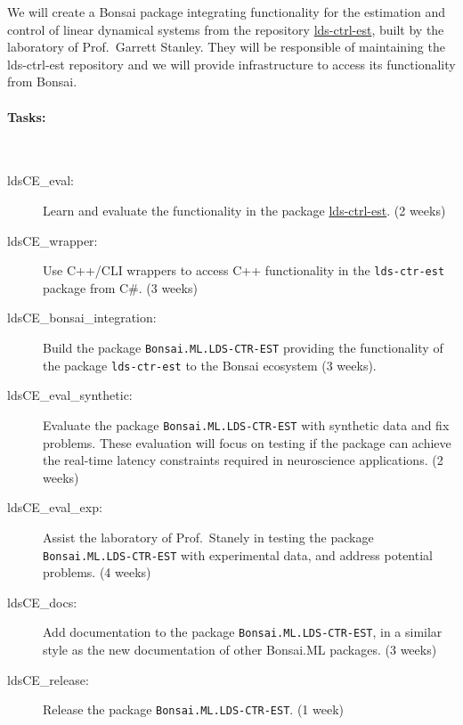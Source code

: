 We will create a Bonsai package integrating functionality for the estimation
and control of linear dynamical systems from the repository
\href{https://github.com/CLOCTools/lds-ctrl-est}{lds-ctrl-est}, built by the
laboratory of Prof.~Garrett Stanley.
%
They will be responsible of maintaining the lds-ctrl-est repository and we will
provide infrastructure to access its functionality from Bonsai.

\paragraph{Tasks:}\mbox{}\\

\begin{description}

    \item[ldsCE\_eval:] Learn and evaluate the functionality in the
        package
        \href{https://github.com/CLOCTools/lds-ctrl-est}{lds-ctrl-est}. (2
        weeks)

    \item[ldsCE\_wrapper:] Use C++/CLI wrappers to access C++
        functionality in the \texttt{lds-ctr-est} package from C\#. (3 weeks)

    \item[ldsCE\_bonsai\_integration:] Build the package
        \texttt{Bonsai.ML.LDS-CTR-EST} providing the functionality of the
        package \texttt{lds-ctr-est} to the Bonsai ecosystem (3 weeks).

    \item[ldsCE\_eval\_synthetic:] Evaluate the package
        \texttt{Bonsai.ML.LDS-CTR-EST} with synthetic data and fix problems.
        These evaluation will focus on testing if the package can achieve the
        real-time latency constraints required in neuroscience applications. (2
        weeks)

    \item[ldsCE\_eval\_exp:] Assist the laboratory of Prof.~Stanely in testing
        the package \texttt{Bonsai.ML.LDS-CTR-EST} with experimental data, and
        address potential problems. (4 weeks)

    \item[ldsCE\_docs:] Add documentation to the package
        \texttt{Bonsai.ML.LDS-CTR-EST}, in a similar style as the new
        documentation of other Bonsai.ML packages.  (3 weeks)

    \item[ldsCE\_release:] Release the package \texttt{Bonsai.ML.LDS-CTR-EST}.
        (1 week)

\end{description}

